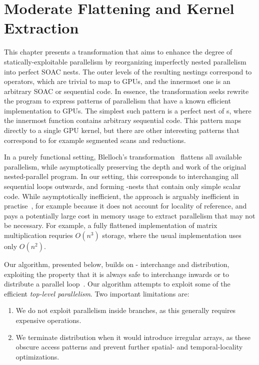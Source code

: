 \renewcommand{\G}[1]{G#1}

\chapter{Moderate Flattening and Kernel Extraction}
\label{chap:kernel-extraction}

This chapter presents a transformation that aims to enhance the degree
of statically-exploitable parallelism by reorganizing imperfectly
nested parallelism into perfect SOAC nests.  The outer levels of the
resulting nestings correspond to  operators, which are trivial
to map to GPUs, and the innermost one is an arbitrary SOAC or
sequential code.  In essence, the transformation seeks rewrite the
program to express patterns of parallelism that have a known efficient
implementation to GPUs.  The simplest such pattern is a perfect nest
of s, where the innermost function contains arbitrary
sequential code.  This pattern maps directly to a single GPU kernel,
but there are other interesting patterns that correspond to for
example segmented scans and reductions.

In a purely functional setting, Blelloch's
transformation~\cite{blelloch1990vector} flattens all available
parallelism, while asymptotically preserving the depth and work of the
original nested-parallel program.  In our setting, this corresponds to
interchanging all sequential loops outwards, and forming
-nests that contain only simple scalar code.  While
asymptotically inefficient, the approach is arguably inefficient in
practise~\cite{bergstrom2012nested}, for example because it does not
account for locality of reference, and pays a potentially large cost
in memory usage to extract parallelism that may not be necessary.  For
example, a fully flattened implementation of matrix multiplication
requries $O(n^{3})$ storage, where the usual implementation uses only
$O(n^{2})$.

Our algorithm, presented below, builds on -
interchange and  distribution, exploiting the property that it
is always safe to interchange inwards or to distribute a parallel
loop~\cite{Allen-Kennedy2002}.  Our algorithm attempts to exploit some
of the efficient \textit{top-level parallelism}.  Two important
limitations are:

\begin{enumerate}
\item We do not exploit parallelism inside  branches, as this
  generally requires expensive  operations.
\item We terminate distribution when it would introduce irregular
  arrays, as these obscure access patterns and prevent further
  spatial- and temporal-locality optimizations.
\end{enumerate}


